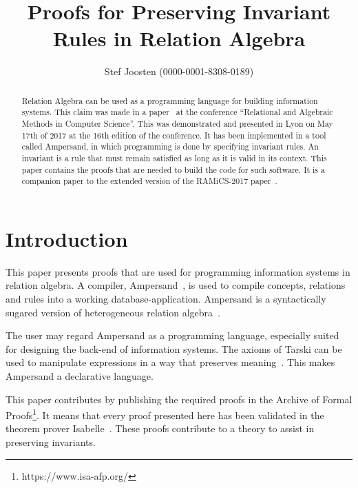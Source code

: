 \documentclass[11pt,a4paper]{article}
\begin{document}
\title{Proofs for Preserving Invariant Rules in Relation Algebra}
\author{Stef Joosten (0000-0001-8308-0189)}
\maketitle

\begin{abstract}
	Relation Algebra can be used as a programming language for building information systems.
	This claim was made in a paper~\cite{Joosten2017} at the conference
	``Relational and Algebraic Methods in Computer Science''.
	This was demonstrated and presented in Lyon on May 17th of 2017 at the 16th edition of the conference.
	It has been implemented in a tool called Ampersand,
	in which programming is done by specifying invariant rules.
	An invariant is a rule that must remain satisfied as long as it is valid in its context.
	This paper contains the proofs that are needed to build the code for such software.
	It is a companion paper to the extended version of the RAMiCS-2017 paper~\cite{Joosten-AFP17}.
\end{abstract}

\tableofcontents

\section{Introduction}
\label{sct:Introduction}
	This paper presents proofs that are used for programming information systems in relation algebra.
	A compiler, Ampersand~\cite{Michels2011}, is used to compile concepts, relations and rules into a working database-application.
	Ampersand is a syntactically sugared version of heterogeneous relation algebra~\cite{Schmidt1997}.
	
	The user may regard Ampersand as a programming language, especially suited for designing the back-end of information systems.
	The axioms of Tarski can be used to manipulate expressions in a way that preserves meaning~\cite{vdWoude2011}.
	This makes Ampersand a declarative language.

	This paper contributes by publishing the required proofs in the Archive of Formal Proofs\footnote{https://www.isa-afp.org/}.
	It means that every proof presented here has been validated in the theorem prover Isabelle~\cite{Nipkow2002}.
	These proofs contribute to a theory to assist in preserving invariants.





\end{document}
